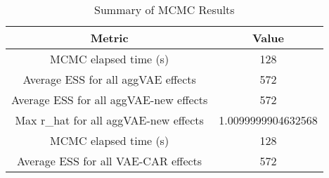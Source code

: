 
\begin{table}[h!]
\centering
\begin{tabular}{|c|c|}
\hline
\textbf{Metric} & \textbf{Value} \\
\hline
MCMC elapsed time (s) & 128 \\
\hline
Average ESS for all aggVAE effects & 572 \\
\hline
Average ESS for all aggVAE-new effects & 572 \\
\hline
Max r\_hat for all aggVAE-new effects & 1.0099999904632568 \\
\hline
MCMC elapsed time (s) & 128 \\
\hline
Average ESS for all VAE-CAR effects & 572 \\
\hline
\end{tabular}
\caption{Summary of MCMC Results}
\label{table:mcmc_summary}
\end{table}
